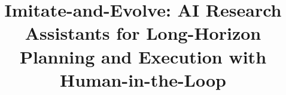 \documentclass[manuscript,review,anonymous]{acmart}
\begin{document}
\title{Imitate-and-Evolve: AI Research Assistants for Long-Horizon Planning and Execution with Human-in-the-Loop}









\end{document}
